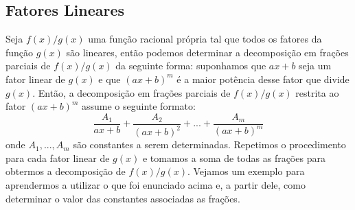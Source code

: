 	\subsection*{Fatores Lineares}
	
	Seja $f(x)/g(x)$ uma função racional própria tal que todos os fatores da função $g(x)$ são lineares, então podemos determinar a decomposição em frações parciais de $f(x)/g(x)$ da seguinte forma: suponhamos que $ax + b$ seja um fator linear de $g(x)$ e que $(ax+b)^m$ é a maior potência desse fator que divide $g(x)$. Então, a decomposição em frações parciais de $f(x)/g(x)$ restrita ao fator $(ax+b)^m$ assume o seguinte formato:
	$$ \frac{A_1}{ax + b} + \frac{A_2}{(ax+b)^2} + ... + \frac{A_m}{(ax + b)^m}$$
	onde $A_1, ..., A_m$ são constantes a serem determinadas. Repetimos o procedimento para cada fator linear de $g(x)$ e tomamos a soma de todas as frações para obtermos a decomposição de $f(x)/g(x)$. Vejamos um exemplo para aprendermos a utilizar o que foi enunciado acima e, a partir dele, como determinar o valor das constantes associadas as frações.
	
